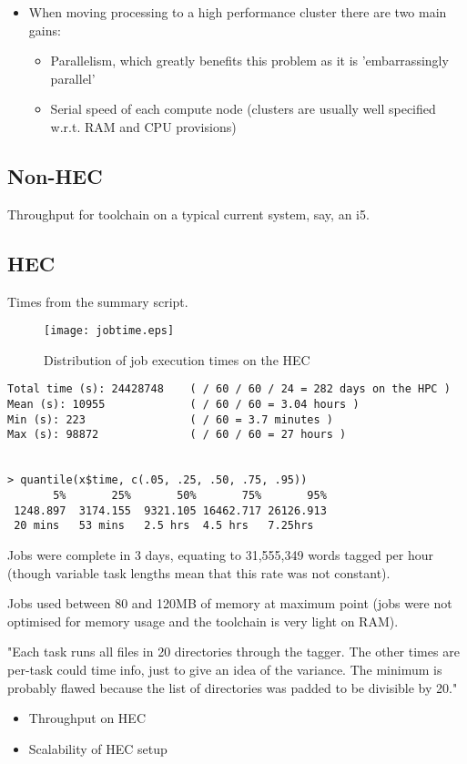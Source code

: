 \begin{itemize}
    \item When moving processing to a high performance cluster there are two main gains:
        \begin{itemize}
            \item Parallelism, which greatly benefits this problem as it is 'embarrassingly parallel'
            \item Serial speed of each compute node (clusters are usually well specified w.r.t. RAM and CPU provisions)
        \end{itemize}
\end{itemize}

\subsection{Non-HEC}
Throughput for toolchain on a typical current system, say, an i5.  


\subsection{HEC}
Times from the summary script.


\begin{figure}[h]
\centering
\texttt{[image: jobtime.eps]}
\caption{Distribution of job execution times on the HEC}
\label{fig:jobtimes}
\end{figure}



{\small
\begin{verbatim}
Total time (s): 24428748    ( / 60 / 60 / 24 = 282 days on the HPC )
Mean (s): 10955             ( / 60 / 60 = 3.04 hours )
Min (s): 223                ( / 60 = 3.7 minutes )
Max (s): 98872              ( / 60 / 60 = 27 hours )


> quantile(x$time, c(.05, .25, .50, .75, .95))
       5%       25%       50%       75%       95% 
 1248.897  3174.155  9321.105 16462.717 26126.913 
 20 mins   53 mins   2.5 hrs  4.5 hrs   7.25hrs
\end{verbatim}
}




Jobs were complete in 3 days, equating to 31,555,349 words tagged per hour (though variable task lengths mean that this rate was not constant).

Jobs used between 80 and 120MB of memory at maximum point (jobs were not optimised for memory usage and the toolchain is very light on RAM).

"Each task runs all files in 20 directories through the tagger.  The other times are per-task could time info, just to give an idea of the variance.
The minimum is probably flawed because the list of directories was padded to be divisible by 20."

\begin{itemize}
    \item Throughput on HEC
    \item Scalability of HEC setup
\end{itemize}

